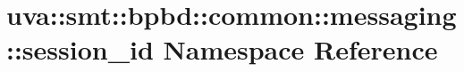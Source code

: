 \hypertarget{namespaceuva_1_1smt_1_1bpbd_1_1common_1_1messaging_1_1session__id}{}\section{uva\+:\+:smt\+:\+:bpbd\+:\+:common\+:\+:messaging\+:\+:session\+\_\+id Namespace Reference}
\label{namespaceuva_1_1smt_1_1bpbd_1_1common_1_1messaging_1_1session__id}
